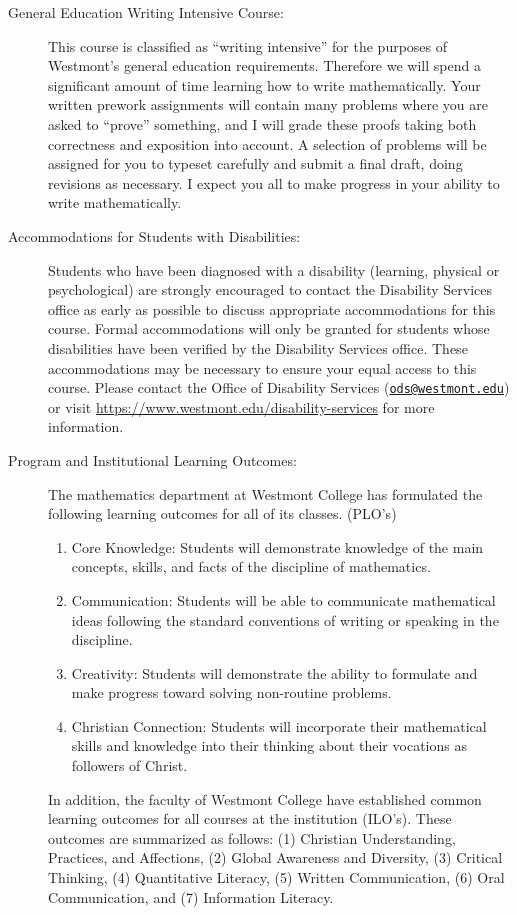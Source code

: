 \documentclass[
  twoside]{article}
\begin{document}
\begin{description}
\clearpage

\item[General Education Writing Intensive Course:] This course is
  classified as ``writing intensive'' for the purposes of Westmont's general
  education requirements.  Therefore we will spend a significant amount of time
  learning how to write mathematically.  Your written prework assignments will contain many
  problems where you are asked to ``prove'' something, and I will grade these
  proofs taking both correctness and exposition into account.  A selection of problems will be assigned for you to typeset carefully and submit a final draft, doing revisions as necessary. I expect you all to make progress in
  your ability to write mathematically.

\item[Accommodations for Students with Disabilities:] Students who have been diagnosed with a disability (learning, physical or psychological) are strongly encouraged to contact the Disability Services office as early as possible to discuss appropriate accommodations for this course. Formal accommodations will only be granted for students whose disabilities have been verified by the Disability Services office.  These accommodations may be necessary to ensure your equal access to this course.  Please contact the Office of Disability Services (\href{mailto:ods@westmont.edu}{\tt ods@westmont.edu}) or visit \url{https://www.westmont.edu/disability-services} for more information.

\item[Program and Institutional Learning Outcomes:] The
         mathematics department at Westmont College has formulated the
         following learning outcomes for all of its classes. (PLO's)
\begin{enumerate}[noitemsep]
\item Core Knowledge: Students will demonstrate knowledge of the
                  main concepts, skills, and facts of the discipline of
                  mathematics.
\item Communication: Students will be able to communicate mathematical ideas
     following the standard conventions of writing or speaking in the
     discipline.
\item Creativity: Students will demonstrate the ability to formulate and make
     progress toward solving non-routine problems.
\item Christian Connection: Students will incorporate their mathematical skills
     and knowledge into their thinking about their vocations as followers of
     Christ.
         \end{enumerate}
         In addition, the faculty of Westmont College have established common
         learning outcomes for all courses at the institution
         (ILO's). These outcomes are summarized as follows:
(1) Christian Understanding, Practices, and Affections,
(2) Global Awareness and Diversity,
(3) Critical Thinking,
(4) Quantitative Literacy,
(5) Written Communication,
(6) Oral Communication, and
(7) Information Literacy.


\end{description}
\end{document}
